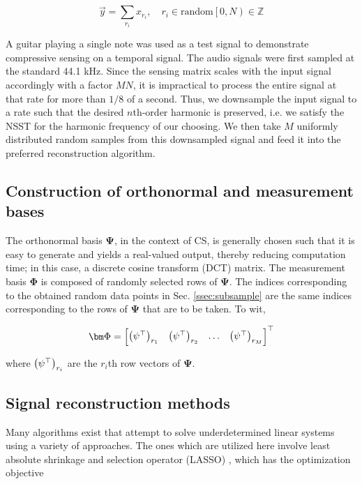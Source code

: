 \documentclass[10pt,a4paper,twoside]{article}
\begin{document}
\begin{equation}\label{eq:randomsample}
	\vec{y} = \sum_{r_i} x_{r_i}, \quad r_i \in \textrm{random}\left[ 0, N \right) \in \mathbb{Z}
\end{equation}

A guitar playing a single note was used as a test signal to demonstrate compressive sensing on a temporal signal. The audio signals were first sampled at the standard 44.1 kHz. Since the sensing matrix scales with the input signal accordingly with a factor $MN$, it is impractical to process the entire signal at that rate for more than $1/8$ of a second. Thus, we downsample the input signal to a rate such that the desired $n$th-order harmonic is preserved, i.e. we satisfy the NSST for the harmonic frequency of our choosing. We then take $M$ uniformly distributed random samples from this downsampled signal and feed it into the preferred reconstruction algorithm.

\subsection{Construction of orthonormal and measurement bases}\label{ssec:bases}
The orthonormal basis $\bm\Psi$, in the context of CS, is generally chosen such that it is easy to generate and yields a real-valued output, thereby reducing computation time; in this case, a discrete cosine transform (DCT) matrix. The measurement basis $\bm\Phi$ is composed of randomly selected rows of $\bm\Psi$. The indices corresponding to the obtained random data points in Sec. \ref{ssec:subsample} are the same indices corresponding to the rows of $\bm\Psi$ that are to be taken. To wit,

\begin{equation}\label{eq:constructbasis}
	\bm\Phi = \mqty[ \qty(\psi^\top)_{r_1} & \qty(\psi^\top)_{r_2} & \hdots  & \qty(\psi^\top)_{r_M} ]^\top
\end{equation}

where $\qty(\psi^\top)_{r_i}$ are the $r_i$th row vectors of $\bm\Psi$.

\subsection{Signal reconstruction methods}\label{ssec:recon}
Many algorithms exist that attempt to solve underdetermined linear systems using a variety of approaches. The ones which are utilized here involve least absolute shrinkage and selection operator (LASSO) \cite{pyrunner}, which has the optimization objective
\end{document}
